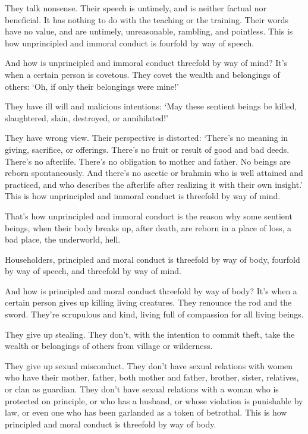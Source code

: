\documentclass[12pt,openany]{book}%
\begin{document}
They talk nonsense. Their speech is untimely, and is neither factual nor beneficial. It has nothing to do with the teaching or the training. Their words have no value, and are untimely, unreasonable, rambling, and pointless. This is how unprincipled and immoral conduct is fourfold by way of speech. 

And how is unprincipled and immoral conduct threefold by way of mind? It's when a certain person is covetous. They covet the wealth and belongings of others: ‘Oh, if only their belongings were mine!’ 

They have ill will and malicious intentions: ‘May these sentient beings be killed, slaughtered, slain, destroyed, or annihilated!’ 

They have wrong view. Their perspective is distorted: ‘There’s no meaning in giving, sacrifice, or offerings. There’s no fruit or result of good and bad deeds. There’s no afterlife. There’s no obligation to mother and father. No beings are reborn spontaneously. And there’s no ascetic or brahmin who is well attained and practiced, and who describes the afterlife after realizing it with their own insight.’ This is how unprincipled and immoral conduct is threefold by way of mind. 

That’s how unprincipled and immoral conduct is the reason why some sentient beings, when their body breaks up, after death, are reborn in a place of loss, a bad place, the underworld, hell. 

Householders, principled and moral conduct is threefold by way of body, fourfold by way of speech, and threefold by way of mind. 

And how is principled and moral conduct threefold by way of body? It’s when a certain person gives up killing living creatures. They renounce the rod and the sword. They’re scrupulous and kind, living full of compassion for all living beings. 

They give up stealing. They don’t, with the intention to commit theft, take the wealth or belongings of others from village or wilderness. 

They give up sexual misconduct. They don’t have sexual relations with women who have their mother, father, both mother and father, brother, sister, relatives, or clan as guardian. They don’t have sexual relations with a woman who is protected on principle, or who has a husband, or whose violation is punishable by law, or even one who has been garlanded as a token of betrothal. This is how principled and moral conduct is threefold by way of body. 
\end{document}
